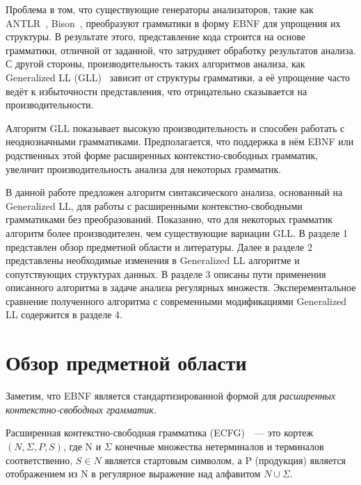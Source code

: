 Проблема в том, что существующие генераторы анализаторов, такие как ANTLR~\cite{ANTLRa}, Bison~\cite{Bison}, преобразуют грамматики в форму EBNF
для упрощения их структуры. В результате этого, представление кода строится на основе грамматики, отличной от заданной,
что затрудняет обработку результатов анализа. С другой стороны, производительность таких алгоритмов анализа,
как Generalized LL (GLL)~\cite{scott2010gll}
зависит от структуры грамматики, а её упрощение часто ведёт к избыточности представления, что отрицательно сказывается на производительности.

Алгоритм GLL показывает высокую производительность и способен работать с неоднозначными грамматиками. 
Предполагается, что поддержка в нём EBNF или родственных этой форме расширенных контекстно-свободных грамматик,
увеличит производительность анализа для некоторых грамматик.

В данной работе предложен алгоритм синтаксического анализа, основанный на Generalized LL, для работы с расширенными
контекстно-свободными грамматиками без преобразований.
Показанно, что для некоторых грамматик алгоритм более производителен, чем существующие вариации GLL.
В разделе 1 представлен обзор предметной области и литературы. Далее в разделе 2 представлены необходимые изменения в Generalized LL алгоритме
и сопутствующих структурах данных. В разделе 3 описаны пути применения описанного алгоритма в задаче анализа регулярных множеств.
Эксперементальное сравнение полученного алгоритма с современными модификациями Generalized LL содержится в разделе 4.

\section{Обзор предметной области}
Заметим, что EBNF 
является стандартизированной формой для \textit{расширенных контекстно-свободных грамматик}.

\begin{mydef}
	Расширенная контекстно-свободная грамматика (ECFG)~\cite{ECFG}~--- это кортеж $(N, \Sigma, P, S)$,
	где N и $\Sigma$ конечные множества нетерминалов и терминалов соответственно, 
	$S\in N$ является стартовым символом, а P (продукция) является отображением из N в
	регулярное выражение над алфавитом $N \cup \Sigma$.    
\end{mydef}


